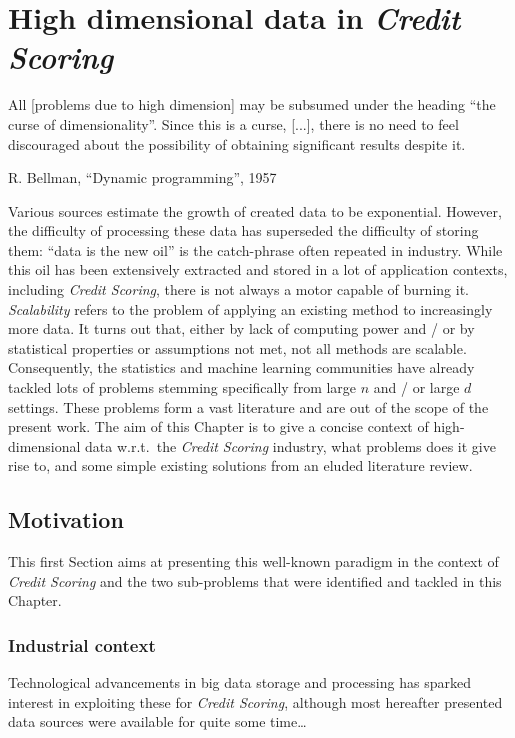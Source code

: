 \chapter{High dimensional data in \textit{Credit Scoring}} \label{chap7}


\epigraph{All [problems due to high dimension] may be subsumed under the heading “the curse of dimensionality”. Since this is a curse, [...], there is no need to feel discouraged about the possibility of obtaining significant results despite it.}{R. Bellman, ``Dynamic programming'', 1957}

\minitoc

Various sources estimate the growth of created data to be exponential. However, the difficulty of processing these data has superseded the difficulty of storing them: ``data is the new oil'' is the catch-phrase often repeated in industry. While this oil has been extensively extracted and stored in a lot of application contexts, including \textit{Credit Scoring}, there is not always a motor capable of burning it. \textit{Scalability} refers to the problem of applying an existing method to increasingly more data. It turns out that, either by lack of computing power and / or by statistical properties or assumptions not met, not all methods are scalable.
Consequently, the statistics and machine learning communities have already tackled lots of problems stemming specifically from large $n$ and / or large $d$ settings.
These problems form a vast literature and are out of the scope of the present work.
The aim of this Chapter is to give a concise context of high-dimensional data w.r.t.\ the \textit{Credit Scoring} industry, what problems does it give rise to, and some simple existing solutions from an eluded literature review.

\section{Motivation}

This first Section aims at presenting this well-known paradigm in the context of \textit{Credit Scoring} and the two sub-problems that were identified and tackled in this Chapter.

\subsection{Industrial context}

Technological advancements in big data storage and processing has sparked interest in exploiting these for \textit{Credit Scoring}, although most hereafter presented data sources were available for quite some time\dots

